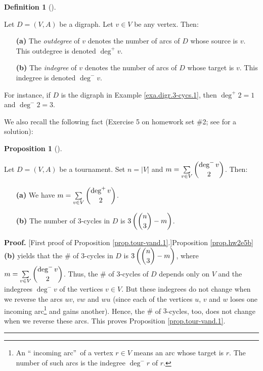 \documentclass[numbers=enddot,12pt,final,onecolumn,notitlepage]{scrartcl}%
\numberwithin{exer}{subsection}
\theoremstyle{definition}
\newtheorem{prop}[theo]{Proposition}
\newenvironment{proposition}[1][]
{\begin{prop}[#1]\begin{leftbar}}
{\end{leftbar}\end{prop}}
\newtheorem{defi}[theo]{Definition}
\newenvironment{definition}[1][]
{\begin{defi}[#1]\begin{leftbar}}
{\end{leftbar}\end{defi}}
\newenvironment{proof}[1][Proof]{\noindent\textbf{#1.} }{\ \rule{0.5em}{0.5em}}
\let\sumnonlimits\sum
\renewcommand{\sum}{\sumnonlimits\limits}
\begin{document}
\begin{definition}
\label{def.digr.indeg}Let $D=\left(  V,A\right)  $ be a digraph. Let $v\in V$
be any vertex. Then:

\begin{enumerate}
\item[\textbf{(a)}] The \emph{outdegree} of $v$ denotes the number of arcs of
$D$ whose source is $v$. This outdegree is denoted $\deg^{+}v$.

\item[\textbf{(b)}] The \emph{indegree} of $v$ denotes the number of arcs of
$D$ whose target is $v$. This indegree is denoted $\deg^{-}v$.
\end{enumerate}
\end{definition}

For instance, if $D$ is the digraph in Example \ref{exa.digr.3-cycs.1}, then
$\deg^{+}2=1$ and $\deg^{-}2=3$.

We also recall the following fact (Exercise 5 on homework set \#2; see
\cite{hw2s} for a solution):

\begin{proposition}
\label{prop.hw2e5b}Let $D=\left(  V,A\right)  $ be a tournament. Set
$n=\left\vert V\right\vert $ and $m=\sum_{v\in V}\dbinom{\deg^{-}v}{2}$. Then:

\begin{enumerate}
\item[\textbf{(a)}] We have $m=\sum_{v\in V}\dbinom{\deg^{+}v}{2}$.

\item[\textbf{(b)}] The number of $3$-cycles in $D$ is $3\left(  \dbinom{n}%
{3}-m\right)  $.
\end{enumerate}
\end{proposition}

\begin{proof}
[First proof of Proposition \ref{prop.tour-vand.1}.]Proposition
\ref{prop.hw2e5b} \textbf{(b)} yields that the $\#$ of $3$-cycles in $D$ is
$3\left(  \dbinom{n}{3}-m\right)  $, where $m=\sum_{v\in V}\dbinom{\deg^{-}%
v}{2}$. Thus, the $\#$ of $3$-cycles of $D$ depends only on $V$ and the
indegrees $\deg^{-}v$ of the vertices $v\in V$. But these indegrees do not
change when we reverse the arcs $uv$, $vw$ and $wu$ (since each of the
vertices $u$, $v$ and $w$ loses one incoming arc\footnote{An \textquotedblleft
incoming arc\textquotedblright\ of a vertex $r\in V$ means an arc whose target
is $r$. The number of such arcs is the indegree $\deg^{-}r$ of $r$.} and gains
another). Hence, the $\#$ of $3$-cycles, too, does not change when we reverse
these arcs. This proves Proposition \ref{prop.tour-vand.1}.
\end{proof}
\end{document}
